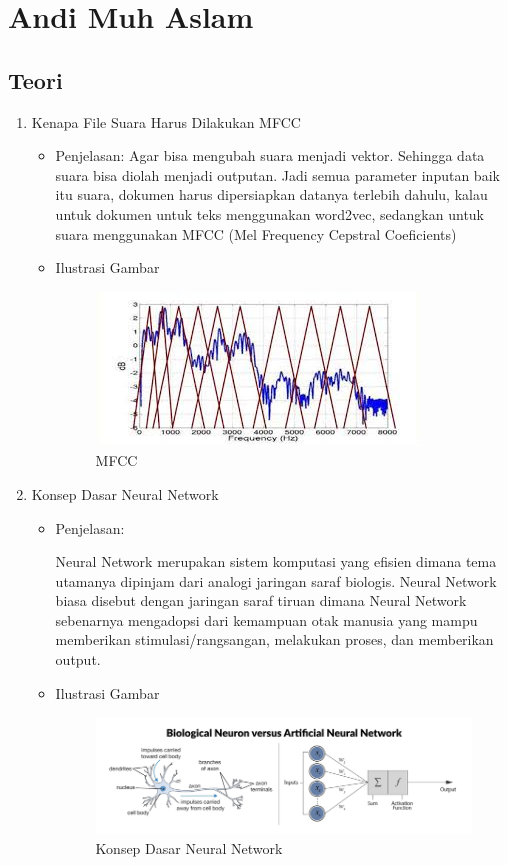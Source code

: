 \section{Andi Muh Aslam}
\subsection{Teori}
\begin{enumerate}
\item Kenapa File Suara Harus Dilakukan MFCC
\begin{itemize}
\item Penjelasan: Agar bisa mengubah suara menjadi vektor. Sehingga data suara bisa diolah menjadi outputan. Jadi semua parameter inputan baik itu suara, dokumen harus dipersiapkan datanya terlebih dahulu, kalau untuk dokumen untuk teks menggunakan word2vec, sedangkan untuk suara menggunakan MFCC (Mel Frequency Cepstral Coeficients) 

\item Ilustrasi Gambar
\begin{figure}[!hbtp]
\centering
\includegraphics[scale=0.7]{figures/andi/61.jpg}
\caption{MFCC}
\label{Contoh 1}
\end{figure}
\end{itemize}


\item Konsep Dasar Neural Network
\begin{itemize}
\item  Penjelasan:
\par Neural Network merupakan sistem komputasi yang efisien dimana tema utamanya dipinjam dari analogi jaringan saraf biologis. Neural Network biasa disebut dengan jaringan saraf tiruan dimana Neural Network sebenarnya mengadopsi dari kemampuan otak manusia yang mampu memberikan stimulasi/rangsangan, melakukan proses, dan memberikan output.

\item Ilustrasi Gambar
\begin{figure}[!hbtp]
\centering
\includegraphics[scale=0.3]{figures/andi/62.png}
\caption{Konsep Dasar Neural Network}
\label{Contoh 2}
\end{figure}


\end{itemize}
\end{enumerate}
